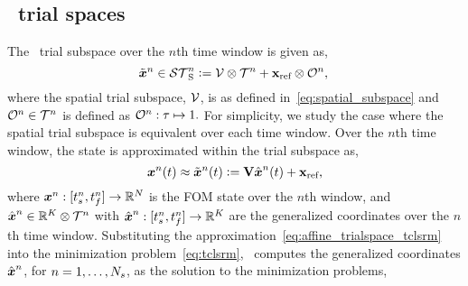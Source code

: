 \subsection{\spatialAcronym\ trial spaces}
The \spatialAcronym\ trial subspace over the $n$th time window is given as, 
\begin{equation}\label{eq:sttrialspace}
 \tilde{\boldsymbol x}^{n} \in \mathcal{ ST }_{\text{S}}^{n} \vcentcolon= 
\mathcal{V } \otimes \mathcal{T}^{n} +
	\mathbf{x}_\text{ref}\otimes\mathcal{O}^n,\\ 
\end{equation}
where the spatial trial subspace, $\mathcal{V }$, is as defined in~\eqref{eq:spatial_subspace} and 
$\mathcal{O}^n\in\mathcal{T}^{n}$ is defined as
$\mathcal{O}^n:\tau\mapsto 1.$
For simplicity, we study the case 
where the spatial trial subspace is equivalent over each time window. Over the $n$th time window, the state is approximated within the trial subspace as, 
\begin{equation}\label{eq:affine_trialspace_tclsrm}
{\boldsymbol x}^{n}(t) \approx \tilde{\boldsymbol x}^{n}(t) \vcentcolon= \mathbf {V} \hat{ \boldsymbol x}^{n}(t) + \mathbf{x}_\text{ref},
\end{equation}
where ${\boldsymbol x}^{n}: [t_s^{n},t_f^{n}] \rightarrow \mathbb{R}^{N}$ is the FOM state over the $n$th window, and $\hat{ \boldsymbol x}^{n} \in \mathbb{R}^{K} \otimes \mathcal{T}^{n}$ with $\hat{ \boldsymbol x}^{n}: [t_s^{n},t_f^{n}] \rightarrow \mathbb{R}^{K}$ are the generalized coordinates over the $n$th time window. 
Substituting the approximation~\eqref{eq:affine_trialspace_tclsrm} into the minimization problem~\eqref{eq:tclsrm}, \methodAcronym\ computes  
the generalized coordinates $\hat{ \boldsymbol x}^{n}$, for $n = 1,\ldots,N_s$, as the solution to the minimization problems,

